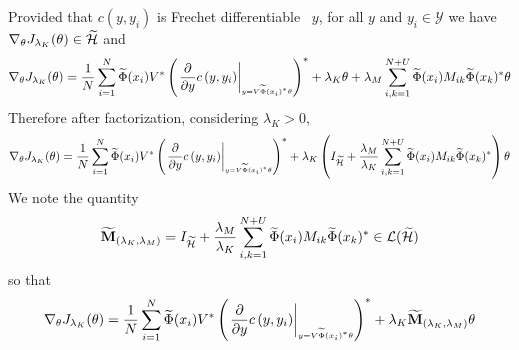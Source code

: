 Provided that $c(y,y_i)$ is Frechet differentiable \wrt~$y$, for all $y$ and $y_i\in\mathcal{Y}$ we have $\nabla_{\theta} J_{\lambda_K}(\theta) \in \widetilde{\mathcal{H}}$ and
\begin{dmath*}
\nabla_{\theta} J_{\lambda_K}(\theta) = \frac{1}{N}\sum_{i=1}^N \tildePhi{\omega}(x_i)V^\adjoint \left(\lderivativeat{c\left(y, y_i\right)}{y}{V\tildePhi{\omega}(x_i)^\adjoint \theta}\right)^\adjoint + \lambda_K\theta + \lambda_M\sum_{i,k=1}^{N+U}\tildePhi{\omega}(x_i)M_{ik}\tildePhi{\omega}(x_k)^\adjoint \theta
\end{dmath*}
Therefore after factorization, considering $\lambda_K > 0$,
\begin{dmath*}
\nabla_{\theta} J_{\lambda_K}(\theta) = \frac{1}{N}\sum_{i=1}^N \tildePhi{\omega}(x_i)V^\adjoint \left(\lderivativeat{c\left(y, y_i\right)}{y}{V\tildePhi{\omega}(x_i)^\adjoint \theta}\right)^\adjoint + \lambda_K\left(I_{\tildeH{\omega}} + \frac{\lambda_M}{\lambda_K}\sum_{i,k=1}^{N+U}\tildePhi{\omega}(x_i)M_{ik}\tildePhi{\omega}(x_k)^\adjoint \right)\theta
\end{dmath*}
We note the quantity
\begin{dmath}
\mathbf{\widetilde{M}}_{\left(\lambda_K,\lambda_M\right)}=I_{\tildeH{\omega}} + \frac{\lambda_M}{\lambda_K}\sum_{i,k=1}^{N+U}\tildePhi{\omega}(x_i)M_{ik}\tildePhi{\omega}(x_k)^\adjoint \in \mathcal{L}(\tildeH{\omega})
\end{dmath}
so that
\begin{dmath*}
\nabla_{\theta} J_{\lambda_K}(\theta) = \frac{1}{N}\sum_{i=1}^N \tildePhi{\omega}(x_i)V^\adjoint \left(\lderivativeat{c\left(y, y_i\right)}{y}{V\tildePhi{\omega}(x_i)^\adjoint \theta}\right)^\adjoint + \lambda_K\mathbf{\widetilde{M}}_{\left(\lambda_K,\lambda_M\right)}\theta
\end{dmath*}
